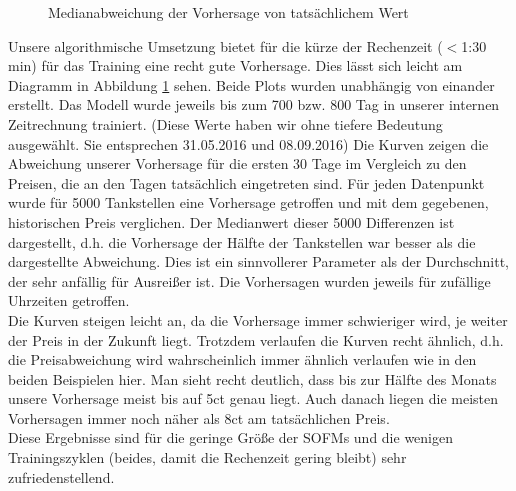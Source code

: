 \documentclass[11pt]{article}
\begin{document}
	\begin{figure}
		\centering
		\caption{Medianabweichung der Vorhersage von tatsächlichem Wert}
		\label{Median}
	\end{figure}

	Unsere algorithmische Umsetzung bietet für die kürze der Rechenzeit ($<$1:30 min) für das Training eine recht gute Vorhersage. Dies lässt sich leicht am Diagramm in Abbildung \ref{Median} sehen. Beide Plots wurden unabhängig von einander erstellt. Das Modell wurde jeweils bis zum 700 bzw. 800 Tag in unserer internen Zeitrechnung trainiert. (Diese Werte haben wir ohne tiefere Bedeutung ausgewählt. Sie entsprechen 31.05.2016 und 08.09.2016) Die Kurven zeigen die Abweichung unserer Vorhersage für die ersten 30 Tage im Vergleich zu den Preisen, die an den Tagen tatsächlich eingetreten sind. Für jeden Datenpunkt wurde für 5000 Tankstellen eine Vorhersage getroffen und mit dem gegebenen, historischen Preis verglichen. Der Medianwert dieser 5000 Differenzen ist dargestellt, d.h. die Vorhersage der Hälfte der Tankstellen war besser als die dargestellte Abweichung. Dies ist ein sinnvollerer Parameter als der Durchschnitt, der sehr anfällig für Ausreißer ist. Die Vorhersagen wurden jeweils für zufällige Uhrzeiten getroffen.\\
	Die Kurven steigen leicht an, da die Vorhersage immer schwieriger wird, je weiter der Preis in der Zukunft liegt. Trotzdem verlaufen die Kurven recht ähnlich, d.h. die Preisabweichung wird wahrscheinlich immer ähnlich verlaufen wie in den beiden Beispielen hier. Man sieht recht deutlich, dass bis zur Hälfte des Monats unsere Vorhersage meist bis auf 5ct genau liegt. Auch danach liegen die meisten Vorhersagen immer noch näher als 8ct am tatsächlichen Preis.\\
	Diese Ergebnisse sind für die geringe Größe der SOFMs und die wenigen Trainingszyklen (beides, damit die Rechenzeit gering bleibt) sehr zufriedenstellend. 
\end{document}

